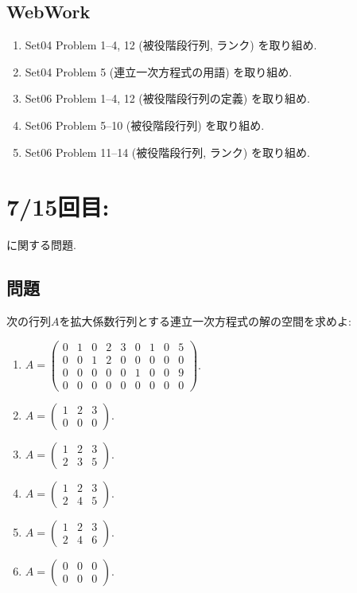 \subsection{WebWork}
\begin{enumerate}
\item Set04 Problem 1--4, 12 (被役階段行列, ランク) を取り組め.
\item Set04 Problem 5 (連立一次方程式の用語) を取り組め.
\item Set06 Problem 1--4, 12 (被役階段行列の定義) を取り組め.
\item Set06 Problem 5--10 (被役階段行列) を取り組め.
\item Set06 Problem 11--14 (被役階段行列, ランク) を取り組め.

\end{enumerate}

\newpage
\section{7/15回目: }
に関する問題.
\subsection{問題}
\begin{quiz}
  次の行列$A$を拡大係数行列とする連立一次方程式の解の空間を求めよ:
  \begin{enumerate}
  \item $A=\begin{pmatrix}0&1&0&2&3&0&1&0&5\\0&0&1&2&0&0&0&0&0\\0&0&0&0&0&1&0&0&9\\0&0&0&0&0&0&0&0&0
  \end{pmatrix}$.
  \item $A=\begin{pmatrix}1&2&3\\0&0&0\end{pmatrix}$.
    \item $A=\begin{pmatrix}1&2&3\\2&3&5\end{pmatrix}$.
    \item $A=\begin{pmatrix}1&2&3\\2&4&5\end{pmatrix}$.
    \item $A=\begin{pmatrix}1&2&3\\2&4&6\end{pmatrix}$.
    \item $A=\begin{pmatrix}0&0&0\\0&0&0\end{pmatrix}$.
  \end{enumerate}
\end{quiz}

